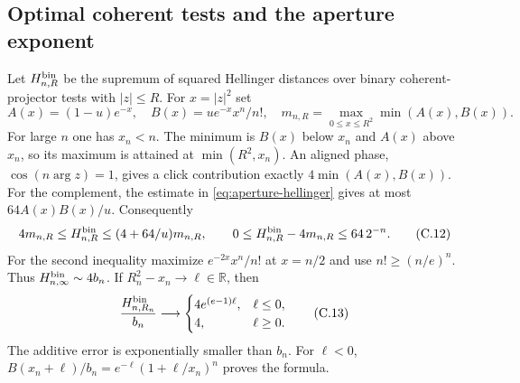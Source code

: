 \subsection{Optimal coherent tests and the aperture exponent}
Let $H_{n,R}^{\rm bin}$ be the supremum of squared Hellinger distances over
binary coherent-projector tests with $|z|\le R$.
For $x=|z|^2$ set
\[
 A(x)=(1-u)e^{-x},\quad B(x)=ue^{-x}x^n/n!,\quad
 m_{n,R}=\max_{0\le x\le R^2}\min(A(x),B(x)).
\]
For large $n$ one has $x_n<n$. The minimum is $B(x)$ below $x_n$ and
$A(x)$ above $x_n$, so its maximum is attained at $\min(R^2,x_n)$.
An aligned phase, $\cos(n\arg z)=1$, gives a click contribution exactly
$4\min(A(x),B(x))$. For the complement, the estimate in
\eqref{eq:aperture-hellinger} gives at most $64A(x)B(x)/u$.
Consequently
\[
 4m_{n,R}\le H_{n,R}^{\rm bin}\le(4+64/u)m_{n,R},
 \qquad
 0\le H_{n,R}^{\rm bin}-4m_{n,R}\le64\,2^{-n}.
 \tag{C.12}\label{eq:rare-binary-sandwich}
\]
For the second inequality maximize $e^{-2x}x^n/n!$ at $x=n/2$ and use
$n!\ge(n/e)^n$. Thus $H_{n,\infty}^{\rm bin}\sim4b_n$.
If $R_n^2-x_n\to\ell\in\mathbb R$, then
\[
 \frac{H_{n,R_n}^{\rm bin}}{b_n}\longrightarrow
 \begin{cases}4e^{(e-1)\ell},&\ell\le0,\\4,&\ell\ge0.\end{cases}
 \tag{C.13}\label{eq:rare-binary-profile}
\]
The additive error is exponentially smaller than $b_n$. For $\ell<0$,
$B(x_n+\ell)/b_n=e^{-\ell}(1+\ell/x_n)^n$ proves the formula.

